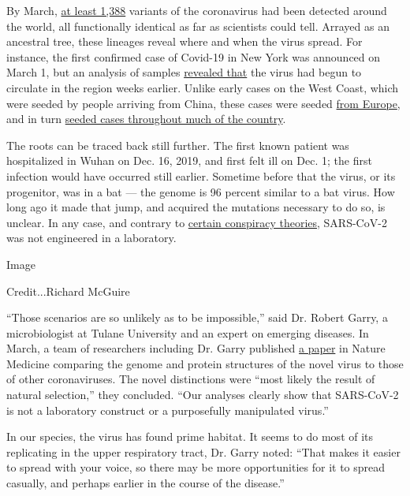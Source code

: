 By March, \href{http://www.graphen.ai/covid.html}{at least 1,388}
variants of the coronavirus had been detected around the world, all
functionally identical as far as scientists could tell. Arrayed as an
ancestral tree, these lineages reveal where and when the virus spread.
For instance, the first confirmed case of Covid-19 in New York was
announced on March 1, but an analysis of samples
\href{https://www.nytimes.com/2020/04/08/science/new-york-coronavirus-cases-europe-genomes.htmlhttps://www.nytimes.com/2020/04/08/science/new-york-coronavirus-cases-europe-genomes.html}{revealed
that} the virus had begun to circulate in the region weeks earlier.
Unlike early cases on the West Coast, which were seeded by people
arriving from China, these cases were seeded
\href{https://nextstrain.org/narratives/ncov/sit-rep/2020-04-17?n=5}{from
Europe}, and in turn
\href{https://www.nytimes.com/2020/05/07/us/new-york-city-coronavirus-outbreak.html}{seeded
cases throughout much of the country}.

The roots can be traced back still further. The first known patient was
hospitalized in Wuhan on Dec. 16, 2019, and first felt ill on Dec. 1;
the first infection would have occurred still earlier. Sometime before
that the virus, or its progenitor, was in a bat --- the genome is 96
percent similar to a bat virus. How long ago it made that jump, and
acquired the mutations necessary to do so, is unclear. In any case, and
contrary to
\href{https://www.nytimes.com/2020/03/13/world/asia/coronavirus-china-conspiracy-theory.html}{certain
conspiracy theories}, SARS-CoV-2 was not engineered in a laboratory.

Image

Credit...Richard McGuire

``Those scenarios are so unlikely as to be impossible,'' said Dr. Robert
Garry, a microbiologist at Tulane University and an expert on emerging
diseases. In March, a team of researchers including Dr. Garry published
\href{https://www.nature.com/articles/S41591-020-0820-9}{a paper} in
Nature Medicine comparing the genome and protein structures of the novel
virus to those of other coronaviruses. The novel distinctions were
``most likely the result of natural selection,'' they concluded. ``Our
analyses clearly show that SARS-CoV-2 is not a laboratory construct or a
purposefully manipulated virus.''

In our species, the virus has found prime habitat. It seems to do most
of its replicating in the upper respiratory tract, Dr. Garry noted:
``That makes it easier to spread with your voice, so there may be more
opportunities for it to spread casually, and perhaps earlier in the
course of the disease.''

